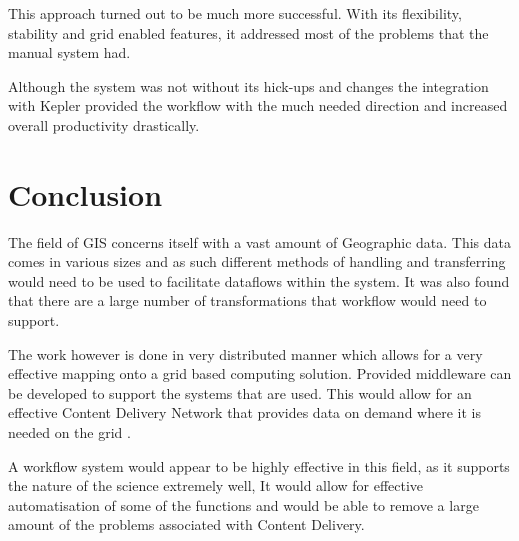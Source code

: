 \documentclass[11pt,twocolumn]{article}
\begin{document}
      This approach turned out to be much more successful. With
      its flexibility, stability and grid enabled features, it
      addressed most of the problems that the manual system had.

      Although the system was not without its hick-ups and changes
      the integration with Kepler provided the workflow with the
      much needed direction and increased overall productivity
      drastically.\cite{daCruz:2008:OSW:1363686.1363983}


\section{Conclusion}
   The field of GIS concerns itself with a vast amount of Geographic
   data. This data comes in various sizes and as such different
   methods of handling and transferring would need to be used to
   facilitate dataflows within the system. It was also found that
   there are a large number of transformations that workflow would
   need to support.

   The work however is done in very distributed manner which allows
   for a very effective mapping onto a grid based computing solution.
   Provided middleware can be developed to support the systems that
   are used. This would allow for an  effective Content Delivery Network
   that provides data on demand where it is needed on the grid
   \cite{Montella:2007:UGC:1272980.1272995}.

   A workflow system would appear to be highly effective in this
   field, as it supports the nature of the science extremely well,
   It would allow for effective automatisation of some of the
   functions and would be able to remove a large amount of the
   problems associated with Content Delivery.
   \cite{Withana:2010:VWE:1851476.1851586}

{}

\end{document}
